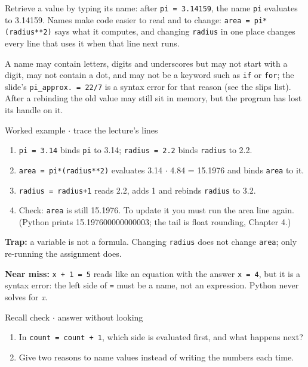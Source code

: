 \documentclass[11pt]{article}
\begin{document}
\begin{keepsection}
Retrieve a value by typing its name: after \texttt{pi = 3.14159}, the name \texttt{pi} evaluates to 3.14159. Names make code easier to read and to change: \texttt{area = pi*(radius**2)} says what it computes, and changing \texttt{radius} in one place changes every line that uses it when that line next runs.

A name may contain letters, digits and underscores but may not start with a digit, may not contain a dot, and may not be a keyword such as \texttt{if} or \texttt{for}; the slide’s \texttt{pi\_approx. = 22/7} is a syntax error for that reason (see the slips list). After a rebinding the old value may still sit in memory, but the program has lost its handle on it.

\begin{workedbox}{Worked example \ensuremath{\cdot} trace the lecture’s lines}
\begin{enumerate}
\item \texttt{pi = 3.14} binds \texttt{pi} to 3.14; \texttt{radius = 2.2} binds \texttt{radius} to 2.2.
\item \texttt{area = pi*(radius**2)} evaluates 3.14 \ensuremath{\cdot} 4.84 = 15.1976 and binds \texttt{area} to it.
\item \texttt{radius = radius+1} reads 2.2, adds 1 and rebinds \texttt{radius} to 3.2.
\item Check: \texttt{area} is still 15.1976. To update it you must run the area line again. (Python prints 15.197600000000003; the tail is float rounding, Chapter 4.)
\end{enumerate}
\end{workedbox}

\begin{notebox}\textbf{Trap:} a variable is not a formula. Changing \texttt{radius} does not change \texttt{area}; only re-running the assignment does.\end{notebox}

\begin{notebox}\textbf{Near miss:} \texttt{x + 1 = 5} reads like an equation with the answer \texttt{x = 4}, but it is a syntax error: the left side of \texttt{=} must be a name, not an expression. Python never solves for \textit{x}.\end{notebox}

\begin{recallbox}{Recall check \ensuremath{\cdot} answer without looking}
\begin{enumerate}
\item In \texttt{count = count + 1}, which side is evaluated first, and what happens next?
\item Give two reasons to name values instead of writing the numbers each time.
\end{enumerate}

\end{recallbox}
\end{keepsection}
\end{document}
